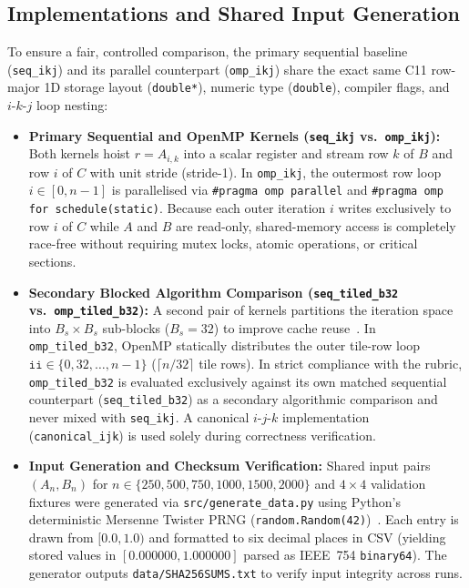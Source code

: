 \documentclass[11pt,a4paper]{article}
\begin{document}
\subsection{Implementations and Shared Input Generation}
To ensure a fair, controlled comparison, the primary sequential baseline (\texttt{seq\_ikj}) and its parallel counterpart (\texttt{omp\_ikj}) share the exact same C11 row-major 1D storage layout (\texttt{double*}), numeric type (\texttt{double}), compiler flags, and $i\text{-}k\text{-}j$ loop nesting:
\begin{itemize}
    \item \textbf{Primary Sequential and OpenMP Kernels (\texttt{seq\_ikj} vs.\ \texttt{omp\_ikj}):} Both kernels hoist $r = A_{i,k}$ into a scalar register and stream row $k$ of $B$ and row $i$ of $C$ with unit stride (stride-1). In \texttt{omp\_ikj}, the outermost row loop $i \in [0, n-1]$ is parallelised via \texttt{\#pragma omp parallel} and \texttt{\#pragma omp for schedule(static)}. Because each outer iteration $i$ writes exclusively to row $i$ of $C$ while $A$ and $B$ are read-only, shared-memory access is completely race-free without requiring mutex locks, atomic operations, or critical sections.
    \item \textbf{Secondary Blocked Algorithm Comparison (\texttt{seq\_tiled\_b32} vs.\ \texttt{omp\_tiled\_b32}):} A second pair of kernels partitions the iteration space into $B_s \times B_s$ sub-blocks ($B_s = 32$) to improve cache reuse~\cite{goto}. In \texttt{omp\_tiled\_b32}, OpenMP statically distributes the outer tile-row loop $\texttt{ii} \in \{0, 32, \dots, n-1\}$ ($\lceil n / 32 \rceil$ tile rows). In strict compliance with the rubric, \texttt{omp\_tiled\_b32} is evaluated exclusively against its own matched sequential counterpart (\texttt{seq\_tiled\_b32}) as a secondary algorithmic comparison and never mixed with \texttt{seq\_ikj}. A canonical $i\text{-}j\text{-}k$ implementation (\texttt{canonical\_ijk}) is used solely during correctness verification.
    \item \textbf{Input Generation and Checksum Verification:} Shared input pairs $(A_n, B_n)$ for $n \in \{250, 500, 750, 1000, 1500, 2000\}$ and $4 \times 4$ validation fixtures were generated via \texttt{src/generate\_data.py} using Python's deterministic Mersenne Twister PRNG (\texttt{random.Random(42)})~\cite{pythonrandom}. Each entry is drawn from $[0.0, 1.0)$ and formatted to six decimal places in CSV (yielding stored values in $[0.000000, 1.000000]$ parsed as IEEE~754 \texttt{binary64}). The generator outputs \texttt{data/SHA256SUMS.txt} to verify input integrity across runs.
\end{itemize}
\end{document}
